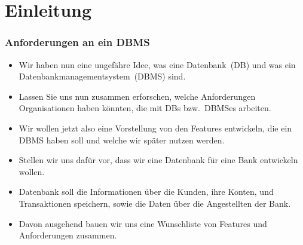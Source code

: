 \documentclass[aspectratio=169,mathserif,notheorems]{beamer}%
\subtitle{3.~Anforderungen an ein DBMS}%
\begin{document}
%
%
\startPresentation%
%
\section{Einleitung}%
%
\begin{frame}[t]%
\frametitle{Anforderungen an ein DBMS}%
\begin{itemize}%
%
\item Wir haben nun eine ungefähre Idee, was eine Datenbank~(DB) und was ein Datenbankmanagementsystem~(DBMS) sind.%
\item<2-> Lassen Sie uns nun zusammen erforschen, welche Anforderungen Organisationen haben könnten, die mit DBs bzw.\ DBMSes arbeiten.%
\item<3-> Wir wollen jetzt also eine Vorstellung von den Features entwickeln, die ein DBMS haben soll und welche wir später nutzen werden.\bigskip%
\item<3-> Stellen wir uns dafür vor, dass wir eine Datenbank für eine Bank entwickeln wollen.%
\item<4-> Datenbank soll die Informationen über die Kunden, ihre Konten, und Transaktionen speichern, sowie die Daten über die Angestellten der Bank.%
\item<5-> Davon ausgehend bauen wir uns eine Wunschliste von Features und Anforderungen zusammen.%
%
\end{itemize}%
\end{frame}%
%
\end{document}
